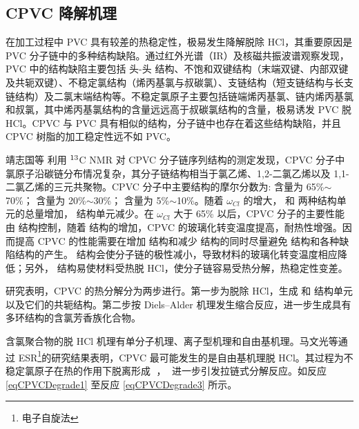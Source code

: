 \subsection{CPVC 降解机理}
在加工过程中 PVC 具有较差的热稳定性，极易发生降解脱除 HCl，其重要原因是 PVC 分子链中的多种结构缺陷。通过红外光谱（IR）及核磁共振波谱观察发现，PVC 中的结构缺陷主要包括 头-头 结构、不饱和双键结构（末端双键、内部双键及共轭双键）、不稳定氯结构（烯丙基氯与叔碳氯）、支链结构（短支链结构与长支链结构）及二氯末端结构等。不稳定氯原子主要包括链端烯丙基氯、链内烯丙基氯和叔氯\cite{15}，其中烯丙基氯结构的含量远远高于叔碳氯结构的含量，极易诱发 PVC 脱 HCl。CPVC 与 PVC 具有相似的结构，分子链中也存在着这些结构缺陷，并且CPVC 树脂的加工稳定性远不如 PVC\cite{6}。\par
\setatomsep{1.5em}
靖志国等 \cite{4} 利用 $\rm{^{13}}$C NMR 对 CPVC 分子链序列结构的测定发现，CPVC 分子中氯原子沿碳链分布情况复杂，其分子链结构相当于氯乙烯、1,2-二氯乙烯以及 1,1-二氯乙烯的三元共聚物。CPVC 分子中主要结构的摩尔分数为: 含量为 65\%$\sim$70\%； 含量为 20\%$\sim$30\%； 含量为 5\%$\sim$10\%。随着 $\omega_{Cl}$ 的增大， 和  两种结构单元的总量增加， 结构单元减少。在 $\omega_{Cl}$ 大于 65\% 以后，CPVC 分子的主要性能由   结构控制，随着   结构的增加，CPVC 的玻璃化转变温度提高，耐热性增强。因而提高 CPVC 的性能需要在增加  结构和减少  结构的同时尽量避免  结构和各种缺陷结构的产生。 结构会使分子链的极性减小，导致材料的玻璃化转变温度相应降低；另外， 结构易使材料受热脱 HCl，使分子链容易受热分解，热稳定性变差。\par

研究表明，CPVC 的热分解分为两步进行\cite{12}。第一步为脱除 HCl，生成  和  结构单元以及它们的共轭结构。第二步按 Diels–Alder 机理发生缩合反应，进一步生成具有多环结构的含氯芳香族化合物。\par
含氯聚合物的脱 HCl 机理有单分子机理、离子型机理和自由基机理。马文光等\cite{22}通过 ESR\footnote{电子自旋法}的研究结果表明，CPVC 最可能发生的是自由基机理脱 HCl。其过程为不稳定氯原子在热的作用下脱离形成 $\;$，$\;$ 进一步引发拉链式分解反应。如反应 \eqref{eqCPVCDegrade1} 至反应 \eqref{eqCPVCDegrade3} 所示。

